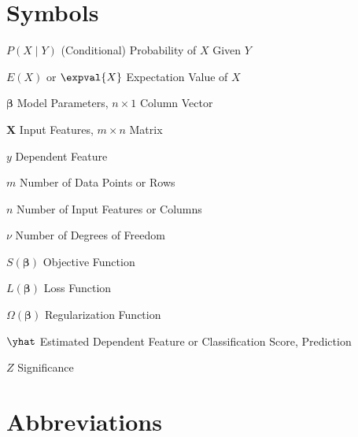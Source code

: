 \abbreviations

\section*{Symbols}

\begin{symbollist}
	\item[$P\left(X \mid Y\right)$] (Conditional) Probability of $X$ Given $Y$
	\item[$E\left(X\right)$ or $\expval{X}$] Expectation Value of $X$
	\item[$\bm{\beta}$] Model Parameters, $n \times 1$ Column Vector
	\item[$\mathbf{X}$] Input Features, $m \times n$ Matrix
	\item[$y$] Dependent Feature
	\item[$m$] Number of Data Points or Rows
	\item[$n$] Number of Input Features or Columns
	\item[$\nu$] Number of Degrees of Freedom
	\item[$S\left(\bm{\beta}\right)$] Objective Function
	\item[$L\left(\bm{\beta}\right)$] Loss Function
	\item[$\Omega\left(\bm{\beta}\right)$] Regularization Function
	\item[$\yhat$] Estimated Dependent Feature or Classification Score, Prediction
	\item[$Z$] Significance
\end{symbollist}

\section*{Abbreviations}


